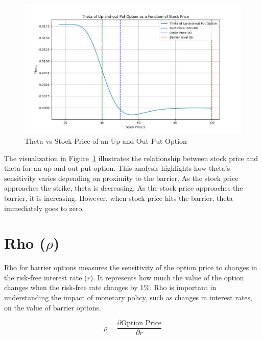 \begin{figure}[H]
	\centering
	\includegraphics[width=.65\linewidth]{content/images/theta_upout.png}
	\caption{Theta vs Stock Price of an Up-and-Out Put Option}
	\label{fig:theta_behavior}
\end{figure}


The visualization in Figure~\ref{fig:theta_behavior} illustrates the relationship between stock price and theta for an up-and-out put option. This analysis highlights how theta's sensitivity varies depending on proximity to the barrier. As the stock price approaches the strike, theta is decreasing. As the stock price approaches the barrier, it is increasing. However, when stock price hits the barrier, theta immediately goes to zero.


\section{Rho ($\rho$)}

Rho for barrier options measures the sensitivity of the option price to changes in the risk-free interest rate (\(r\)). It represents how much the value of the option changes when the risk-free rate changes by 1\%. Rho is important in understanding the impact of monetary policy, such as changes in interest rates, on the value of barrier options.

\[
\rho = \frac{\partial \text{Option Price}}{\partial r}
\]

